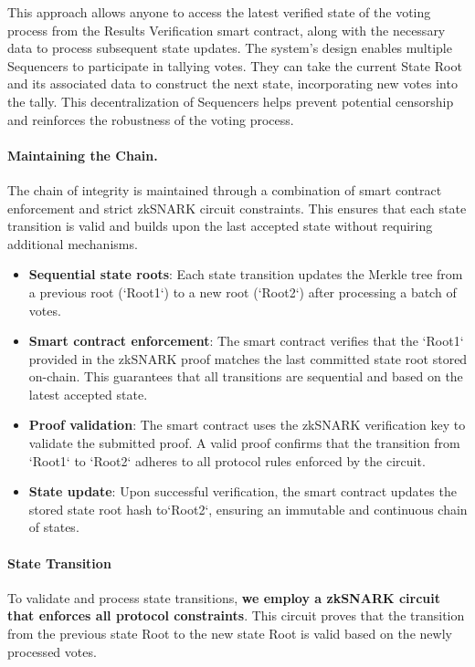 This approach allows anyone to access the latest verified state of the voting process from the Results Verification smart contract, along with the necessary data to process subsequent state updates. The system's design enables multiple Sequencers to participate in tallying votes. They can take the current State Root and its associated data to construct the next state, incorporating new votes into the tally. This decentralization of Sequencers helps prevent potential censorship and reinforces the robustness of the voting process.

\paragraph{Maintaining the Chain.}

The chain of integrity is maintained through a combination of smart contract enforcement and strict zkSNARK circuit constraints. This ensures that each state transition is valid and builds upon the last accepted state without requiring additional mechanisms.

\begin{itemize}
	\item \textbf{Sequential state roots}: Each state transition updates the Merkle tree from a previous root (`Root1`) to a new root (`Root2`) after processing a batch of votes.
	\item \textbf{Smart contract enforcement}: The smart contract verifies that the `Root1` provided in the zkSNARK proof matches the last committed state root stored on-chain. This guarantees that all transitions are sequential and based on the latest accepted state.
	\item \textbf{Proof validation}: The smart contract uses the zkSNARK verification key to validate the submitted proof. A valid proof confirms that the transition from `Root1` to `Root2` adheres to all protocol rules enforced by the circuit.
	\item \textbf{State update}: Upon successful verification, the smart contract updates the stored state root hash to`Root2`, ensuring an immutable and continuous chain of states.
\end{itemize}

\paragraph{State Transition}

To validate and process state transitions, \textbf{we employ a zkSNARK circuit that enforces all protocol constraints}. This circuit proves that the transition from the previous state Root to the new state Root is valid based on the newly processed votes.

